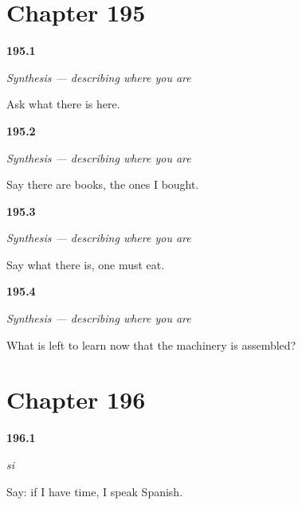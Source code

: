 \section*{Chapter 195}

\noindent\begin{minipage}[t]{\linewidth}
\raggedright
\hypertarget{review-ES-C54-sintesis-lo-que-hay-ask}{\textbf{195.1}} \emph{Synthesis — describing where you are}\par
\small Ask what there is here.
\end{minipage}\par\medskip

\noindent\begin{minipage}[t]{\linewidth}
\raggedright
\hypertarget{review-ES-C54-sintesis-lo-que-hay-pick}{\textbf{195.2}} \emph{Synthesis — describing where you are}\par
\small Say there are books, the ones I bought.
\end{minipage}\par\medskip

\noindent\begin{minipage}[t]{\linewidth}
\raggedright
\hypertarget{review-ES-C54-sintesis-lo-que-hay-must}{\textbf{195.3}} \emph{Synthesis — describing where you are}\par
\small Say what there is, one must eat.
\end{minipage}\par\medskip

\noindent\begin{minipage}[t]{\linewidth}
\raggedright
\hypertarget{review-ES-C54-sintesis-lo-que-hay-done}{\textbf{195.4}} \emph{Synthesis — describing where you are}\par
\small What is left to learn now that the machinery is assembled?
\end{minipage}\par\medskip

\section*{Chapter 196}

\noindent\begin{minipage}[t]{\linewidth}
\raggedright
\hypertarget{review-ES-C55-si-say}{\textbf{196.1}} \emph{si}\par
\small Say: if I have time, I speak Spanish.
\end{minipage}\par\medskip

